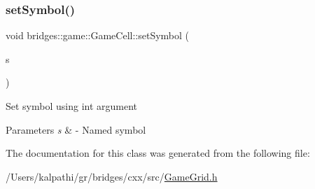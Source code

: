 \subsubsection{\texorpdfstring{setSymbol()}{setSymbol()}}
{\footnotesize\ttfamily void bridges\+::game\+::\+Game\+Cell\+::set\+Symbol (\begin{DoxyParamCaption}\item[{\mbox{\hyperlink{namespacebridges_1_1game_ab9a19c7ab6e2ebac2f95180e21733487}{Named\+Symbol}}}]{s }\end{DoxyParamCaption})\hspace{0.3cm}{\ttfamily [inline]}}

Set symbol using int argument 
\begin{DoxyParams}{Parameters}
{\em s} & -\/ Named symbol \\
\hline
\end{DoxyParams}


The documentation for this class was generated from the following file\+:\begin{DoxyCompactItemize}
\item 
/\+Users/kalpathi/gr/bridges/cxx/src/\mbox{\hyperlink{_game_grid_8h}{Game\+Grid.\+h}}\end{DoxyCompactItemize}
